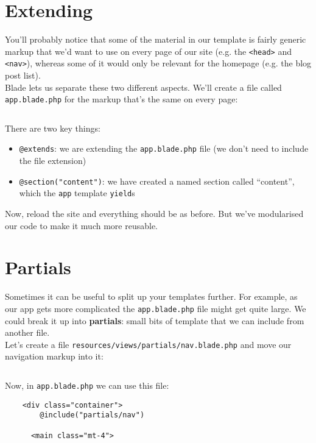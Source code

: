 \section{Extending}

You'll probably notice that some of the material in our template is fairly generic markup that we'd want to use on every page of our site (e.g. the \texttt{<head>} and \texttt{<nav>}), whereas some of it would only be relevant for the homepage (e.g. the blog post list).
\\

Blade lets us separate these two different aspects. We'll create a file called \texttt{app.blade.php} for the markup that's the same on every page:

\inputminted{html}{06-blade/figures/04-welcome.blade.php}

There are two key things:

\begin{itemize}
    \item \texttt{@extends}: we are extending the \texttt{app.blade.php} file (we don't need to include the file extension)
    \item \texttt{@section("content")}: we have created a named section called ``content'', which the \texttt{app} template \texttt{yield}s
\end{itemize}

Now, reload the site and everything should be as before. But we've modularised our code to make it much more reusable.


\section{Partials}

Sometimes it can be useful to split up your templates further. For example, as our app gets more complicated the \texttt{app.blade.php} file might get quite large. We could break it up into \textbf{partials}: small bits of template that we can include from another file.
\\

Let's create a file \texttt{resources/views/partials/nav.blade.php} and move our navigation markup into it:

\inputminted{html}{06-blade/figures/05-nav.blade.php}

Now, in \texttt{app.blade.php} we can use this file:

\begin{verbatim}
    <div class="container">
        @include("partials/nav")

      <main class="mt-4">
\end{verbatim}

